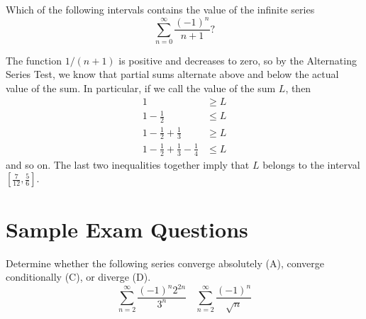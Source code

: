 \documentclass{ximera}
\begin{document}
\begin{question}%

Which of the following intervals contains the value of the infinite series
\[ \sum_{n=0}^\infty \frac{(-1)^n}{n+1}? \]
\begin{multiplechoice}
\end{multiplechoice}
\begin{feedback}
The function \(1/(n+1)\) is positive and decreases to zero, so by the Alternating Series Test, we know that partial sums alternate above and below the actual value of the sum.  In particular, if we call the value of the sum \(L\), then
\[
\begin{aligned}
1 & \geq  L \\
1 - \frac{1}{2} & \leq  L \\
1 - \frac{1}{2} + \frac{1}{3} & \geq L \\
1 - \frac{1}{2} + \frac{1}{3} - \frac{1}{4} & \leq L
\end{aligned}
\]
and so on. The last two inequalities together imply that \(L\) belongs to the interval \([\frac{7}{12},\frac{5}{6}]\).
\end{feedback}

\end{question}

\section*{Sample Exam Questions}

\begin{question}%

Determine whether the following series converge absolutely (A), converge conditionally (C), or diverge (D). 
\[ \sum_{n=2}^\infty \frac{(-1)^n 2^{2n}}{3^n} \ \ \ \ \sum_{n=2}^\infty \frac{(-1)^n}{\sqrt{n}} \]
\begin{multiplechoice}
\end{multiplechoice}

\end{question}
\end{document}
